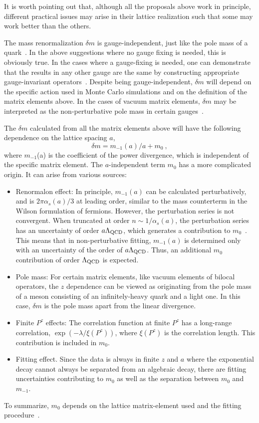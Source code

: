 \documentclass[preprint,12pt]{elsarticle}
\begin{document}
It is worth pointing out that, although all the proposals above work in principle, different practical issues may arise in their lattice realization such that some may work better than the others.

The mass renormalization $\delta m$ is gauge-independent, just like the pole mass
of a quark~\cite{Kronfeld:1998di}. In the above suggestions where no gauge fixing is
needed, this is obviously true. In the cases where a gauge-fixing is needed,
one can demonstrate that the results in any other gauge are the same by
constructing appropriate gauge-invariant operators~\cite{Philipsen:2001ip}.
Despite being gauge-independent, $\delta m$ will depend on the specific action used in Monte Carlo simulations
and on the definition of the matrix elements above.
In the cases of vacuum matrix elements, $\delta m$ may be interpreted
as the non-perturbative pole mass in certain gauges~\cite{Philipsen:2001ip}.

The $\delta m$ calculated from all the matrix elements above will have the following dependence
on the lattice spacing $a$,
\begin{equation}
   \delta m = m_{-1}(a)/a + m_0 \ ,
\end{equation}
where $m_{-1}$(a) is the coefficient of the power divergence, which is independent of the specific matrix element. The $a$-independent term $m_0$
has a more complicated origin. It can arise
from various sources:
\begin{itemize}
\item{Renormalon effect: In principle, $m_{-1}(a)$ can be calculated perturbatively, and is $2\pi\alpha_s(a)/3$ at leading
order, similar to the mass counterterm in the Wilson
formulation of fermions. However, the perturbation series is not convergent. When truncated at order $n\sim 1/\alpha_s(a)$, the
perturbation series has an uncertainty of order $a\Lambda_{\rm QCD}$, which generates a contribution to $m_0$~\cite{Ji:1995tm,Beneke:1998ui,Bauer:2011ws,Bali:2013pla}.
This means that in non-perturbative fitting, $m_{-1}(a)$ is determined only
with an uncertainty of the order of $a\Lambda_{\rm QCD}$. Thus, an additional 
$m_0$ contribution of order $\Lambda_{\rm QCD}$ is expected.}
\item{Pole mass: For certain matrix elements, like vacuum elements of bilocal operators, the $z$
dependence can be viewed as originating from the pole mass of a meson consisting of an infinitely-heavy quark
and a light one. In this case, $\delta m$ is the pole mass apart from the linear divergence.}
\item{Finite $P^z$ effects: The correlation function at finite $P^z$ has a long-range correlation,
$\exp(-\lambda/\xi(P^z))$, where $\xi(P^z)$ is the correlation length. This contribution is included in $m_0$.}
\item{Fitting effect. Since the data is always in finite $z$ and $a$ where the exponential decay
cannot always be separated from an algebraic decay, there are fitting uncertainties
contributing to $m_0$ as well as the separation between $m_0$ and $m_{-1}$.}
\end{itemize}
To summarize, $m_0$ depends on the lattice matrix-element used and the fitting procedure~\cite{Zhang:2017bzy,Chen:2017gck,Izubuchi:2019lyk,Huo:2019vdl}.
\end{document}
